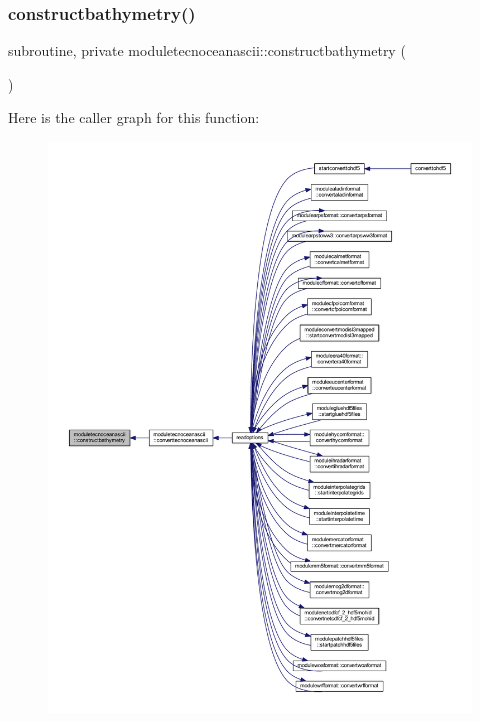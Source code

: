 \subsubsection{\texorpdfstring{constructbathymetry()}{constructbathymetry()}}
{\footnotesize\ttfamily subroutine, private moduletecnoceanascii\+::constructbathymetry (\begin{DoxyParamCaption}{ }\end{DoxyParamCaption})\hspace{0.3cm}{\ttfamily [private]}}

Here is the caller graph for this function\+:\nopagebreak
\begin{figure}[H]
\begin{center}
\leavevmode
\includegraphics[width=350pt]{namespacemoduletecnoceanascii_a9bbaf3300cee7d2c04f566610643dbe8_icgraph}
\end{center}
\end{figure}
\mbox{\label{namespacemoduletecnoceanascii_ac3c04e7c0109f285ad61e9110701e6ce}} 
